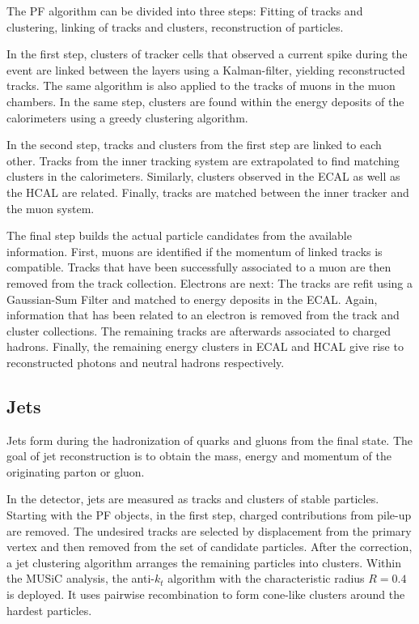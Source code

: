 The \ac{PF} algorithm can be divided into three steps: Fitting of tracks and clustering, linking of tracks and clusters, reconstruction of particles.

In the first step, clusters of tracker cells that observed a current spike during the event are linked between the layers using a Kalman-filter, yielding reconstructed tracks. The same algorithm is also applied to the tracks of muons in the muon chambers. In the same step, clusters are found within the energy deposits of the calorimeters using a greedy clustering algorithm.

In the second step, tracks and clusters from the first step are linked to each other. Tracks from the inner tracking system are extrapolated to find matching clusters in the calorimeters. 
Similarly, clusters observed in the \ac{ECAL} as well as the \ac{HCAL} are related. Finally, tracks are matched between the inner tracker and the muon system.

The final step builds the actual particle candidates from the available information.
First, muons are identified if the momentum of linked tracks is compatible. Tracks that have been successfully associated to a muon are then removed from the track collection. Electrons are next: The tracks are refit using a Gaussian-Sum Filter and matched to energy deposits in the \ac{ECAL}. Again, information that has been related to an electron is removed from the track and cluster collections. The remaining tracks are afterwards associated to charged hadrons. Finally, the remaining energy clusters in \ac{ECAL} and \ac{HCAL} give rise to reconstructed photons and neutral hadrons respectively.

\subsection{Jets}
\label{sec:jets}

Jets form during the hadronization of quarks and gluons from the final state. The goal of jet reconstruction is to obtain the mass, energy and momentum of the originating parton or gluon.

In the detector, jets are measured as tracks and clusters of stable particles. Starting with the \ac{PF} objects, in the first step, charged contributions from pile-up are removed. The undesired tracks are selected by displacement from the primary vertex and then removed from the set of candidate particles.
After the correction, a jet clustering algorithm arranges the remaining particles into clusters. Within the \ac{MUSiC} analysis, the anti-$k_t$ algorithm\cite{Cacciari:antiktjet} with the characteristic radius $R = \num{0.4}$ is deployed. It uses pairwise recombination to form cone-like clusters around the hardest particles.


